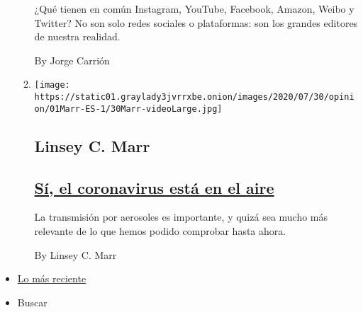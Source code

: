 \begin{enumerate}
\begin{enumerate}
    ¿Qué tienen en común Instagram, YouTube, Facebook, Amazon, Weibo y
    Twitter? No son solo redes sociales o plataformas: son los grandes
    editores de nuestra realidad.

    By Jorge Carrión
  \item
    \texttt{[image: https://static01.graylady3jvrrxbe.onion/images/2020/07/30/opinion/01Marr-ES-1/30Marr-videoLarge.jpg]}

    \hypertarget{linsey-c-marr}{%
    \subsection{Linsey C. Marr}\label{linsey-c-marr}}

    \hypertarget{suxed-el-coronavirus-estuxe1-en-el-aire}{%
    \subsection{\texorpdfstring{\href{/es/2020/08/01/espanol/opinion/coronavirus-aire.html}{Sí,
    el coronavirus está en el
    aire}}{Sí, el coronavirus está en el aire}}\label{suxed-el-coronavirus-estuxe1-en-el-aire}}

    La transmisión por aerosoles es importante, y quizá sea mucho más
    relevante de lo que hemos podido comprobar hasta ahora.

    By Linsey C. Marr
  \end{enumerate}
\end{enumerate}

\begin{itemize}
\tightlist
\item
  \protect\hyperlink{stream-panel}{Lo más reciente}
\item
  Buscar
\end{itemize}


